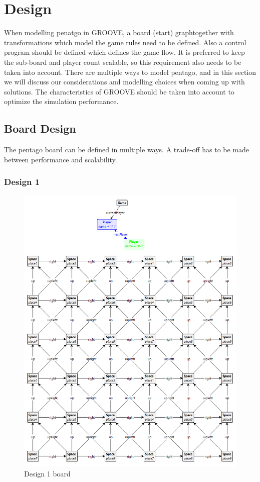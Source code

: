 \section{Design}
\label{Design}
When modelling penatgo in GROOVE, a board (start) graphtogether with transformations which model the game rules need to be defined.
Also a control program should be defined which defines the game flow.
It is preferred to keep the sub-board and player count scalable, so this requirement also needs to be taken into account.
There are multiple ways to model pentago, and in this section we will discuss our considerations and modelling choices when coming up with solutions.
The characteristics of GROOVE should be taken into account to optimize the simulation performance.

\subsection{Board Design}
The pentago board can be defined in multiple ways.
A trade-off has to be made between performance and scalability.

\subsubsection{Design 1}
\label{des1-board-design}

\begin{figure}[!h]
    \centering
    \includegraphics[scale=0.25,clip]{Images/board1.png}
    \caption{Design 1 board}
    \label{fig:board1}
\end{figure}

